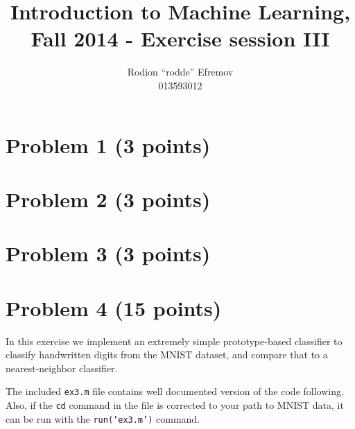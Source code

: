 \documentclass[10pt]{article}
\title{Introduction to Machine Learning, Fall 2014 - Exercise session III}
\author{Rodion ``rodde'' Efremov \\ 013593012}
\begin{document}
 \maketitle

\color{blue}
\section*{Problem 1 (3 points)}

\color{blue}
\section*{Problem 2 (3 points)}

\color{blue}
\section*{Problem 3 (3 points)}

\color{blue}
\section*{Problem 4 (15 points)}
In this exercise we implement an extremely simple prototype-based classifier to classify handwritten digits from the MNIST dataset, and compare that to a nearest-neighbor classifier.

\color{black}
The included \texttt{ex3.m} file contains well documented version of the code following. Also, if the \texttt{cd} command in the file is corrected to your path to MNIST data, it can be run with the \texttt{run('ex3.m')} command.

\color{blue}
\end{document}
